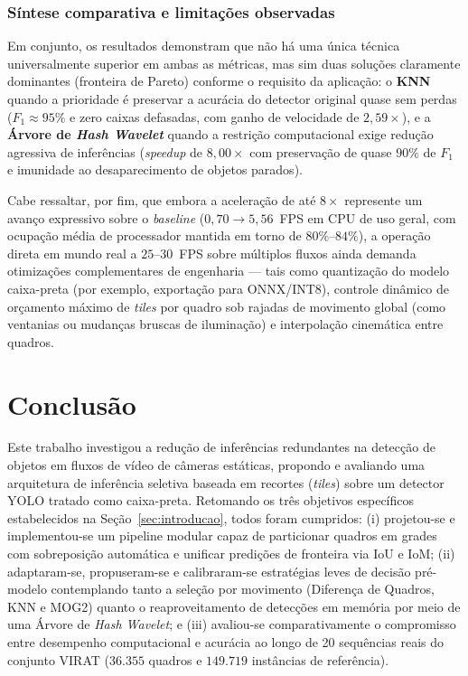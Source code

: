 \documentclass{ieeeaccess}
\begin{document}
\subsubsection{Síntese comparativa e limitações observadas}
Em conjunto, os resultados demonstram que não há uma única técnica universalmente superior em ambas as métricas, mas sim duas soluções claramente dominantes (fronteira de Pareto) conforme o requisito da aplicação: o \textbf{KNN} quando a prioridade é preservar a acurácia do detector original quase sem perdas ($F_1 \approx 95\%$ e zero caixas defasadas, com ganho de velocidade de $2{,}59\times$), e a \textbf{Árvore de \textit{Hash Wavelet}} quando a restrição computacional exige redução agressiva de inferências (\textit{speedup} de $8{,}00\times$ com preservação de quase $90\%$ de $F_1$ e imunidade ao desaparecimento de objetos parados).

Cabe ressaltar, por fim, que embora a aceleração de até $8\times$ represente um avanço expressivo sobre o \textit{baseline} ($0{,}70 \to 5{,}56$~FPS em CPU de uso geral, com ocupação média de processador mantida em torno de $80\%$--$84\%$), a operação direta em mundo real a $25$--$30$~FPS sobre múltiplos fluxos ainda demanda otimizações complementares de engenharia --- tais como quantização do modelo caixa-preta (por exemplo, exportação para ONNX/INT8), controle dinâmico de orçamento máximo de \textit{tiles} por quadro sob rajadas de movimento global (como ventanias ou mudanças bruscas de iluminação) e interpolação cinemática entre quadros.

\section{Conclusão}
\label{sec:conclusao}

Este trabalho investigou a redução de inferências redundantes na detecção de objetos em fluxos de vídeo de câmeras estáticas, propondo e avaliando uma arquitetura de inferência seletiva baseada em recortes (\textit{tiles}) sobre um detector YOLO tratado como caixa-preta. Retomando os três objetivos específicos estabelecidos na Seção~\ref{sec:introducao}, todos foram cumpridos: (i) projetou-se e implementou-se um pipeline modular capaz de particionar quadros em grades com sobreposição automática e unificar predições de fronteira via $\mathrm{IoU}$ e $\mathrm{IoM}$; (ii) adaptaram-se, propuseram-se e calibraram-se estratégias leves de decisão pré-modelo contemplando tanto a seleção por movimento (Diferença de Quadros, KNN e MOG2) quanto o reaproveitamento de detecções em memória por meio de uma Árvore de \textit{Hash Wavelet}; e (iii) avaliou-se comparativamente o compromisso entre desempenho computacional e acurácia ao longo de 20 sequências reais do conjunto VIRAT ($36.355$ quadros e $149.719$ instâncias de referência).
\end{document}

